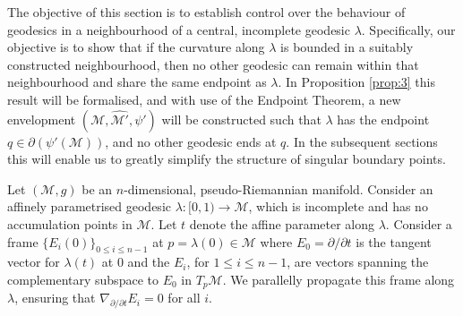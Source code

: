 \documentclass[pdflatex,sn-mathphys-num]{sn-jnl}
\newtheorem{prop}[theorem]{Proposition}
\theoremstyle{definition}
\begin{document}
The objective of this section is to establish control over the behaviour of geodesics in a neighbourhood of a central, incomplete geodesic $\lambda$. Specifically, our objective is to show that if the curvature along $\lambda$ is bounded in a suitably constructed neighbourhood, then no other geodesic can remain within that neighbourhood and share the same endpoint as $\lambda$. 
In Proposition \ref{prop:3} this result will be formalised, and with use of the Endpoint Theorem, a new envelopment $(\mathcal{M},\hat{\mathcal{M}'},\psi')$ will be constructed such that $\lambda$ has the endpoint $q\in \partial(\psi'(\mathcal{M}))$, and no other geodesic ends at $q$. In the subsequent sections this will enable us to greatly simplify the structure of singular boundary points.

    

Let $(\mathcal{M},g)$ be an $n$-dimensional, pseudo-Riemannian manifold. Consider an affinely parametrised geodesic $\lambda: [0,1) \rightarrow \mathcal{M}$, which is incomplete and has no accumulation points in $\mathcal{M}$. Let $t$ denote the affine parameter along $\lambda$. Consider a frame $\{E_i(0)\}_{0 \leq i \leq n-1}$ at $p = \lambda(0) \in \mathcal{M}$ where $E_0 = \partial/\partial t$ is the tangent vector for $\lambda(t)$ at 0 and the $E_i$, for $1 \leq i \leq n-1$, are vectors spanning the complementary subspace to $E_0$ in $T_p \mathcal{M}$. We parallelly propagate this frame along $\lambda$, ensuring that $\nabla_{\partial/\partial t} E_i = 0$ for all $i$.\\
\end{document}
